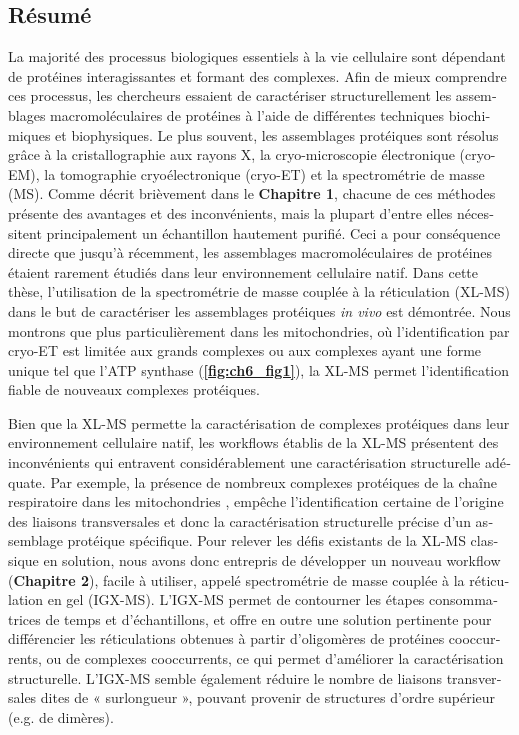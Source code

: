 \begin{otherlanguage}{french}
    \section{Résumé}
    La majorité des processus biologiques essentiels à la vie cellulaire sont dépendant de protéines interagissantes et formant des complexes. Afin de mieux comprendre ces processus, les chercheurs essaient de caractériser structurellement les assemblages macromoléculaires de protéines à l'aide de différentes techniques biochimiques et biophysiques. Le plus souvent, les assemblages protéiques sont résolus grâce à la cristallographie aux rayons X, la cryo-microscopie électronique (cryo-EM), la tomographie cryoélectronique (cryo-ET) et la spectrométrie de masse (MS). Comme décrit brièvement dans le \textbf{Chapitre 1}, chacune de ces méthodes présente des avantages et des inconvénients, mais la plupart d'entre elles nécessitent principalement un échantillon hautement purifié. Ceci a pour conséquence directe que  jusqu'à récemment, les assemblages macromoléculaires de protéines étaient rarement étudiés dans leur environnement cellulaire natif. Dans cette thèse, l'utilisation de la spectrométrie de masse couplée à la réticulation (XL-MS) dans le but de caractériser les assemblages protéiques \emph{in vivo} est démontrée. Nous montrons que plus particulièrement dans les mitochondries, où l'identification par cryo-ET est limitée aux grands complexes ou aux complexes ayant une forme unique \cite{RN1} tel que l'ATP synthase (\textbf{\autoref{fig:ch6_fig1}}), la XL-MS permet l'identification fiable de nouveaux complexes protéiques.

    Bien que la XL-MS permette la caractérisation de complexes protéiques dans leur environnement cellulaire natif, les workflows établis de la XL-MS présentent des inconvénients qui entravent considérablement une caractérisation structurelle adéquate. Par exemple, la présence de nombreux complexes protéiques de la chaîne respiratoire dans les mitochondries \cite{RN3}, empêche l'identification certaine de l'origine des liaisons transversales et donc la caractérisation structurelle précise d'un assemblage protéique spécifique. Pour relever les défis existants de la XL-MS classique en solution, nous avons donc entrepris de développer un nouveau workflow (\textbf{Chapitre 2}), facile à utiliser, appelé spectrométrie de masse couplée à la réticulation en gel (IGX-MS). L'IGX-MS permet de contourner les étapes consommatrices de temps et d'échantillons, et offre en outre une solution pertinente pour différencier les réticulations obtenues à partir d'oligomères de protéines cooccurrents, ou de complexes cooccurrents, ce qui permet d'améliorer la caractérisation structurelle. L'IGX-MS semble également réduire le nombre de liaisons transversales dites de « surlongueur », pouvant provenir de structures d'ordre supérieur (e.g. de dimères).


\end{otherlanguage}
